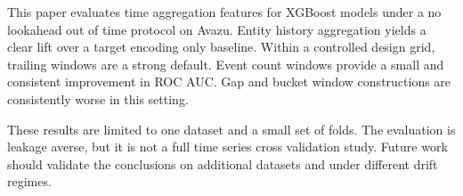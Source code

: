 This paper evaluates time aggregation features for XGBoost models under a no lookahead out of time protocol on Avazu.
Entity history aggregation yields a clear lift over a target encoding only baseline.
Within a controlled design grid, trailing windows are a strong default.
Event count windows provide a small and consistent improvement in ROC AUC.
Gap and bucket window constructions are consistently worse in this setting.

These results are limited to one dataset and a small set of folds.
The evaluation is leakage averse, but it is not a full time series cross validation study.
Future work should validate the conclusions on additional datasets and under different drift regimes.
